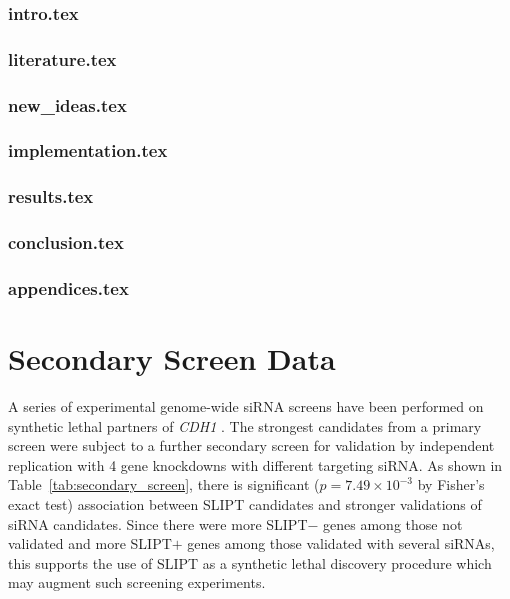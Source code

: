 \subsection{intro.tex}

\subsection{literature.tex}

\subsection{new\_ideas.tex}

\subsection{implementation.tex}

\subsection{results.tex}

\subsection{conclusion.tex}

\subsection{appendices.tex}


\fi

\chapter{Secondary Screen Data}
\label{appendix:secondary_screen}

A series of experimental genome-wide siRNA screens have been performed on synthetic lethal partners of \textit{CDH1} \citep{Telford2015}. The strongest candidates from a primary screen were subject to a further secondary screen for validation by independent replication with 4 gene knockdowns with different targeting siRNA. As shown in Table~\ref{tab:secondary_screen}, there is significant ($p=7.49 \times 10^{-3}$ by Fisher's exact test) %
association between SLIPT candidates and stronger validations of siRNA candidates. Since there were more SLIPT$-$ genes among those not validated and more SLIPT$+$ genes among those validated with several siRNAs, this supports the use of SLIPT as a synthetic lethal discovery procedure which may augment such screening experiments.

